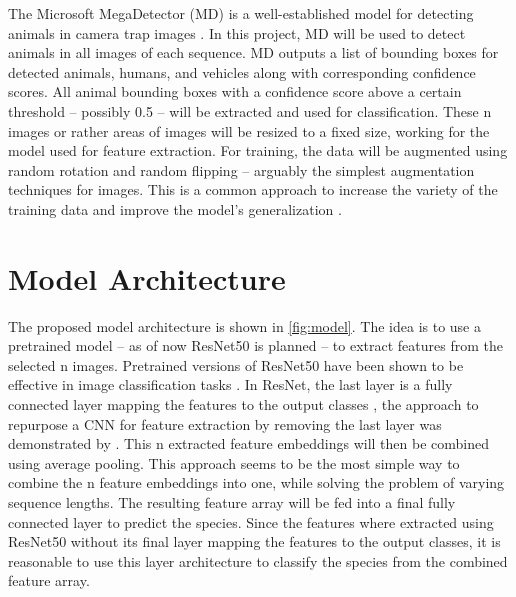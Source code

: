 \documentclass{article}
\begin{document}
The Microsoft MegaDetector (MD) is a well-established model for detecting animals in camera trap images 
\autocite{hernandezPytorchWildlifeCollaborativeDeep2024a, velezChoosingAppropriatePlatform2022,
schneiderRecognitionEuropeanMammals2024}. In this project, MD will be used to detect animals in all images
of each sequence. MD outputs a list of bounding boxes for detected animals, humans, and vehicles
along with corresponding confidence scores. All animal bounding boxes with a confidence score above a certain threshold 
-- possibly 0.5 -- will be extracted and used for classification. These n images or rather areas of images
will be resized to a fixed size, working for the model used for feature extraction. 
For training, the data will be augmented using random rotation 
and random flipping -- arguably the simplest augmentation techniques for images. 
This is a common approach to increase the variety of the
training data and improve the model's generalization \autocite{shortenSurveyImageData2019}.

\section*{Model Architecture} %

The proposed model architecture is shown in \autoref{fig:model}. The idea is to use a pretrained model 
-- as of now ResNet50 is planned -- to extract features from the selected n images.
Pretrained versions of ResNet50 have been shown to be effective in image classification tasks
\autocite{bintaislamAnimalSpeciesRecognition2023}.
In ResNet, the last layer is a fully connected layer mapping the features to the output classes 
\autocite{heDeepResidualLearning2015}, the approach to repurpose a CNN for feature extraction by removing the last
layer was demonstrated by \textcite{razavianCNNFeaturesOfftheshelf2014}.
This n extracted feature embeddings will then be combined using average pooling.  
This approach seems to be the most simple way to combine the
n feature embeddings into one, while solving the problem of varying sequence lengths.
The resulting feature array will be fed into a final fully connected
layer to predict the species. Since the features where extracted using ResNet50 without its final layer
mapping the features to the output classes, it is reasonable to use this layer architecture to classify the species
from the combined feature array. 
\end{document}

